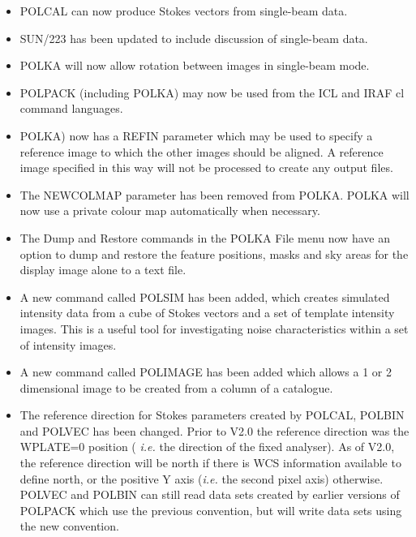 \documentclass[twoside,11pt]{article}
\newcommand{\htmlref}[2]{#1}
\renewcommand{\_}{\texttt{\symbol{95}}}
\begin{document}
\begin{itemize}

\item \htmlref{POLCAL}{POLCAL} can now produce Stokes vectors from
single-beam data.

\item SUN/223 has been updated to include discussion of single-beam data.

\item \htmlref{POLKA}{POLKA} will now allow rotation between images in
single-beam mode.

\item POLPACK (including \htmlref{POLKA}{POLKA}) may now be used from the
ICL and IRAF cl command languages.

\item \htmlref{POLKA}{POLKA}) now has a REFIN parameter which may be used
to specify a reference image to which the other images should be aligned.
A reference image specified in this way will not be processed to create
any output files.

\item The NEWCOLMAP parameter has been removed from \htmlref{POLKA}{POLKA}.
POLKA will now use a private colour map automatically when necessary.

\item The Dump and Restore commands in the \htmlref{POLKA}{POLKA} File menu
now have an option to dump and restore the feature positions, masks and sky 
areas for the display image alone to a text file.

\item A new command called \htmlref{POLSIM}{POLSIM} has been added, which
creates simulated intensity data from a cube of Stokes vectors and a set
of template intensity images. This is a useful tool for investigating
noise characteristics within a set of intensity images.

\item A new command called \htmlref{POLIMAGE}{POLIMAGE} has been added
which allows a 1 or 2 dimensional image to be created from a column of a 
catalogue. 

\item The reference direction for Stokes parameters created by
\htmlref{POLCAL}{POLCAL}, \htmlref{POLBIN}{POLBIN} and
\htmlref{POLVEC}{POLVEC} has been changed.
Prior to V2.0 the reference direction was the WPLATE=0 position (\emph{
i.e.} the direction of the fixed analyser). As of V2.0, the reference
direction will be north if there is WCS information available to define
north, or the positive Y axis (\emph{i.e.} the second pixel axis)
otherwise. \htmlref{POLVEC}{POLVEC} and \htmlref{POLBIN}{POLBIN} can still read data sets
created by earlier versions of POLPACK which use the previous convention, but will 
write data sets using the new convention.


\end{itemize}
\end{document}
